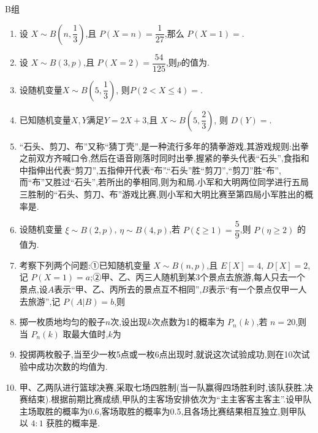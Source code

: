 B组
\begin{enumerate}
\item 设 $X\sim B(n,\dfrac{1}{3})$,且 $P(X=n)=\dfrac{1}{27}$,那么 $P(X=1)=$.

\item 设 $X\sim B(3,p)$,且 $P(X=2)=\dfrac{54}{125}$,则$p$的值为.

\item 设随机变量$X\sim B(5,\dfrac{1}{3})$, 则$P(2<X\le 4) =$.

\item 已知随机变量$X,Y$满足$Y=2X+3$,且 $X\sim B(5,\dfrac{2}{3})$, 则 $D(Y)=$.

\item “石头、剪刀、布”又称“猜丁壳”,是一种流行多年的猜拳游戏,其游戏规则:出拳之前双方齐喊口令,然后在语音刚落时同时出拳,握紧的拳头代表“石头”,食指和中指伸出代表“剪刀”,五指伸开代表“布”.“石头”胜“剪刀”,“剪刀”胜“布”,而“布”又胜过“石头”,若所出的拳相同,则为和局.小军和大明两位同学进行五局三胜制的“石头、剪刀、布”游戏比赛,则小军和大明比赛至第四局小军胜出的概率是.

\item 设随机变量 $\xi\sim B(2,p)$, $\eta\sim B(4,p)$,若 $P(\xi\ge1)=\dfrac{5}{9}$,则 $P(\eta\ge2)$ 的值为.

\item 考察下列两个问题:①已知随机变量 $X\sim B(n,p)$,且 $E[X]=4$, $D[X]=2$, 记 $P(X=1)=a$;②甲、乙、丙三人随机到某3个景点去旅游,每人只去一个景点,设$A$表示“甲、乙、丙所去的景点互不相同”,$B$表示“有一个景点仅甲一人去旅游”,记 $P(A|B)=b$,则

\item 掷一枚质地均匀的骰子$n$次,设出现$k$次点数为1的概率为 $P_{n}(k)$,若 $n=20$,则当 $P_{n}(k)$ 取最大值时,$k$为

\item 投掷两枚骰子,当至少一枚5点或一枚6点出现时,就说这次试验成功,则在10次试验中成功次数的均值为.

\item 甲、乙两队进行篮球决赛,采取七场四胜制(当一队赢得四场胜利时,该队获胜,决赛结束).根据前期比赛成绩,甲队的主客场安排依次为“主主客客主客主”.设甲队主场取胜的概率为0.6,客场取胜的概率为0.5,且各场比赛结果相互独立,则甲队以 $4:1$ 获胜的概率是.


\end{enumerate}
